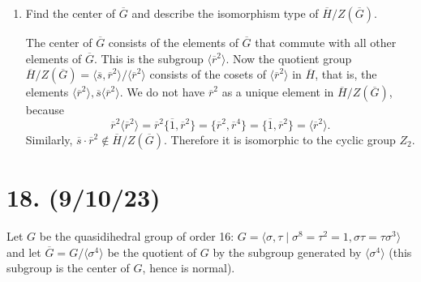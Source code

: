 \documentclass{article}
\begin{document}
\begin{enumerate}[label=(\alph*), itemsep=0em]
\begin{proof}
            The elements of $\overline{H}$ are $\overline{1}, \overline{s}, \overline{r}^2, \text{ and } \overline{s}\cdot\overline{r}^2$. Any other product of elements gives an element of $\overline{H}$. All of these elements have order 2, and so from Ch. 1.1, Exercise 36, $\overline{H} \cong V_4$.

            The complete preimage of $\overline{H}$ under the natural projection homomorphism $\pi(g) \mapsto \overline{g} = g \langle r^4 \rangle$ is the set $\{ g \in G \mid \pi(g) \in \overline{H} \}$. The elements of $G$ in the complete preimage of $\overline{H}$ are $1, r^2, r^4, r^6, s, sr^2, sr^4, \text{ and } sr^6$. This set of elements is isomorphic to $D_4$ (given by $s, r^2 \in \pi^{-1}(\overline{H}) \mapsto s, r \in D_4$).
          \end{proof}
    \item Find the center of $\overline{G}$ and describe the isomorphism type of $\overline{H}/Z(\overline{G})$.
          
          The center of $\overline{G}$ consists of the elements of $\overline{G}$ that commute with all other elements of $\overline{G}$. This is the subgroup $\langle \overline{r}^2 \rangle$. Now the quotient group $\overline{H}/Z(\overline{G}) = \langle \overline{s}, \overline{r}^2 \rangle / \langle \overline{r}^2 \rangle$ consists of the cosets of $\langle \overline{r}^2 \rangle$ in $\overline{H}$, that is, the elements $\langle \overline{r}^2 \rangle, \overline{s}\langle \overline{r}^2 \rangle$. We do not have $\overline{r}^2$ as a unique element in $\overline{H}/Z(\overline{G})$, because
          \begin{equation*}
            \overline{r}^2 \langle \overline{r}^2 \rangle = \overline{r}^2 \{ \overline{1}, \overline{r}^2 \} = \{ \overline{r}^2, \overline{r}^4 \} = \{ \overline{1}, \overline{r}^2 \} = \langle \overline{r}^2 \rangle.
          \end{equation*}
          Similarly, $\overline{s}\cdot\overline{r}^2 \notin \overline{H}/Z(\overline{G})$. Therefore it is isomorphic to the cyclic group $Z_2$.
\end{enumerate}

\section*{18. (9/10/23)}

Let $G$ be the quasidihedral group of order 16: $G = \langle \sigma, \tau \mid \sigma^8 = \tau^2 = 1, \sigma \tau = \tau \sigma^3 \rangle$ and let $\overline{G} = G/\langle \sigma^4 \rangle$ be the quotient of $G$ by the subgroup generated by $\langle \sigma^4 \rangle$ (this subgroup is the center of $G$, hence is normal).
\end{document}
